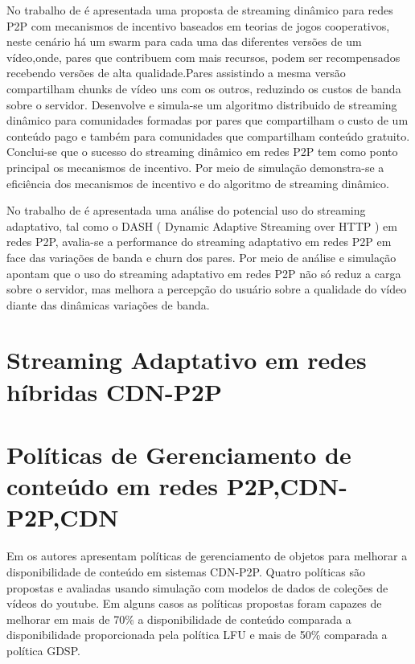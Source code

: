 \documentclass[
	12pt,
	oneside,
	a4paper,
	english,
	brazil
	]{abntex2ppgsi}
\begin{document}
No trabalho de \cite{Tian2013} é apresentada uma proposta de streaming dinâmico para redes P2P com mecanismos de incentivo baseados em teorias de jogos cooperativos, neste cenário há um swarm para cada uma das diferentes versões de um vídeo,onde, pares que contribuem com mais recursos, podem ser recompensados recebendo versões de alta qualidade.Pares assistindo a mesma versão compartilham chunks de vídeo uns com os outros, reduzindo os custos de banda sobre o servidor. Desenvolve e simula-se um algoritmo distribuido de streaming dinâmico para comunidades formadas por pares que compartilham o custo de um conteúdo pago e também para comunidades que compartilham conteúdo gratuito. Conclui-se que o sucesso do streaming dinâmico em redes P2P tem como ponto principal os mecanismos de incentivo. Por meio de simulação demonstra-se a eficiência dos mecanismos de incentivo e do algoritmo de streaming dinâmico.

No trabalho de \cite{Xu2013}é apresentada uma análise do potencial uso do streaming adaptativo, tal como o DASH ( Dynamic Adaptive Streaming over HTTP ) em redes P2P, avalia-se a performance do streaming adaptativo em redes P2P em face das variações de banda e churn dos pares. Por meio de análise e simulação apontam que o uso do streaming adaptativo em redes P2P não só reduz a carga sobre o servidor, mas melhora a percepção do usuário sobre a qualidade do vídeo diante das dinâmicas variações de banda.

\section{Streaming Adaptativo em redes híbridas CDN-P2P}

\section{Políticas de Gerenciamento de conteúdo em redes P2P,CDN-P2P,CDN}

Em \cite{Oliveira} os autores apresentam políticas de gerenciamento de objetos para melhorar a disponibilidade de conteúdo em sistemas CDN-P2P. Quatro políticas são propostas e avaliadas usando simulação com modelos de dados de coleções de vídeos do youtube. Em alguns casos as políticas propostas foram capazes de melhorar em mais de 70\% a disponibilidade de conteúdo comparada a disponibilidade proporcionada pela política LFU e mais de 50\% comparada a política GDSP.
\end{document}
